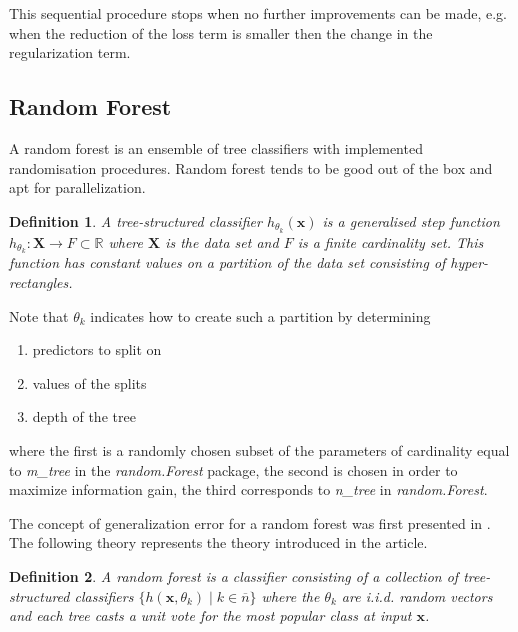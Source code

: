 \documentclass[a4paper,12pt]{article}
\newtheorem{definition}{Definition}[section]
\begin{document}
This sequential procedure stops when no further improvements can be made, e.g. when the reduction of the loss term is smaller then the change in the regularization term. \\

\subsection{Random Forest}
A random forest is an ensemble of tree classifiers with implemented randomisation procedures.
Random forest tends to be good out of the box and apt for parallelization.

\begin{definition}
A tree-structured classifier $h_{\theta_{k} }(\textbf{x})$ is a generalised step function $h_{\theta_{k} }: \textbf{X} \rightarrow F \subset \mathbb{R}$ where $\textbf{X}$ is the data set and $F$ is a finite cardinality set. This function has constant values on a partition of the data set consisting of hyper-rectangles.
\end{definition}
Note that $\theta_{k}$ indicates how to create such a partition by determining 
\begin{enumerate}
\item predictors to split on
\item values of the splits
\item depth of the tree
\end{enumerate}
where the first is a randomly chosen subset of the parameters of cardinality equal to \textit{m\_tree} in the \textit{random.Forest} package, the second is chosen in order to maximize information gain, the third corresponds to \textit{n\_tree} in \textit{random.Forest}. 

The concept of generalization error for a random forest was first presented in \cite{breiman2001random}. The following theory represents the theory introduced in the article. 

\begin{definition}
A random forest is a classifier consisting of a collection of tree-structured classifiers $\{h( \textbf{x},  \theta_{k} ) \mid k \in  \overline{n} \}$ where the $\theta_{k}$ are i.i.d. random vectors and each tree casts a unit vote for the most popular class at input $\textbf{x}$.
\end{definition}
\end{document}
